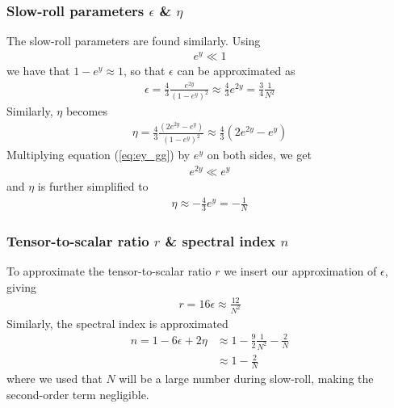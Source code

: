 \documentclass[reprint,english,notitlepage]{revtex4-1}  %
\numberwithin{equation}{section}
\begin{document}
\subsubsection{Slow-roll parameters $\epsilon$ \& $\eta$}
The slow-roll parameters are found similarly. Using
\begin{align}
	e^y \ll 1	\label{eq:ey_gg}
\end{align}
we have that $1-e^y\approx 1$, so that $\epsilon$ can be approximated as
\begin{align}
	\epsilon = \frac{4}{3} \frac{e^{2y}}{(1-e^y)^2}
		 \approx \frac{4}{3} e^{2y}
		 = \frac{3}{4}\frac{1}{N^2}
\end{align}
Similarly, $\eta$ becomes
\begin{align}
	\eta = \frac{4}{3} \frac{(2e^{2y} - e^y)}{(1-e^y)^2}
		 \approx \frac{4}{3} (2e^{2y} - e^y)
\end{align}
Multiplying equation (\ref{eq:ey_gg}) by $e^y$ on both sides, we get
\begin{align}
	e^{2y} \ll e^y
\end{align}
and $\eta$ is further simplified to
\begin{align}
	\eta \approx -\frac{4}{3}e^y = -\frac{1}{N}
\end{align}

\subsubsection{Tensor-to-scalar ratio $r$ \& spectral index $n$}
To approximate the tensor-to-scalar ratio $r$ we insert our approximation
of $\epsilon$, giving
\begin{align}
	r = 16\epsilon \approx \frac{12}{N^2}
\end{align}
Similarly, the spectral index is approximated
\begin{align}
	n = 1 - 6\epsilon + 2\eta &\approx 1 - \frac{9}{2}\frac{1}{N^2} - \frac{2}{N} \\
														&\approx 1 - \frac{2}{N}
\end{align}
where we used that $N$ will be a large number during slow-roll, making the
second-order term negligible.
\\
\end{document}
